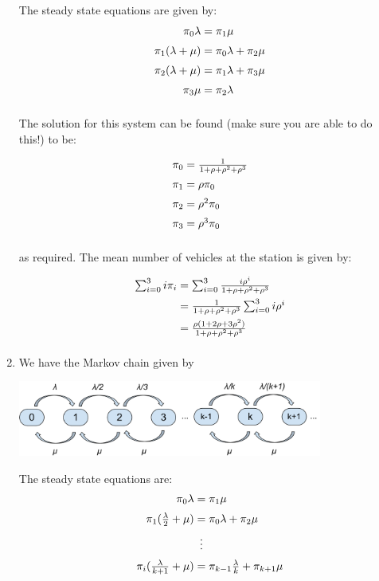 \documentclass[12pt]{article}
\begin{document}
\begin{enumerate}
The steady state equations are given by:
$$\begin{array}{@{}r@{\;}c@{\;}l@{}}
\pi_0\lambda&=&\pi_1\mu\\[2mm]
\pi_1(\lambda+\mu)&=&\pi_0\lambda+\pi_2\mu\\[2mm]
\pi_2(\lambda+\mu)&=&\pi_1\lambda+\pi_3\mu\\[2mm]
\pi_3\mu&=&\pi_{2}\lambda\\[2mm]
\end{array}$$

The solution for this system can be found (make sure you are able to do this!) to be:

$$\begin{array}{@{}r@{\;}c@{\;}l@{}}
\pi_0&=&{1\over 1+\rho+\rho^2+\rho^3}\\[2mm]
\pi_1&=&\rho\pi_0\\[2mm]
\pi_2&=&\rho^2\pi_0\\[2mm]
\pi_3&=&\rho^3\pi_0\\[2mm]
\end{array}$$

as required. The mean number of vehicles at the station is given by:

$$\begin{array}{@{}r@{\;}c@{\;}l@{}}
\sum_{i=0}^3i\pi_i&=&\sum_{i=0}^3{i\rho^i\over 1+\rho+\rho^2+\rho^3}\\[2mm]
&=&{1\over 1+\rho+\rho^2+\rho^3}\sum_{i=0}^3i\rho^i\\[2mm]
&=&{\rho(1+2\rho+3\rho^2)\over 1+\rho+\rho^2+\rho^3}\\[2mm]
\end{array}$$


\item We have the Markov chain given by

\begin{center}
\includegraphics[width=10cm]{exercise_6_markov_chain}
\end{center}

The steady state equations are:
$$\begin{array}{@{}r@{\;}c@{\;}l@{}}
\pi_0\lambda&=&\pi_1\mu\\[2mm]
\pi_1({\lambda\over2}+\mu)&=&\pi_0\lambda+\pi_2\mu\\[2mm]
&\vdots&\\[2mm]
\pi_{i}({\lambda\over k+1}+\mu)&=&\pi_{k-1}{\lambda\over k}+\pi_{k+1}\mu
\end{array}$$


\end{enumerate}
\end{document}
